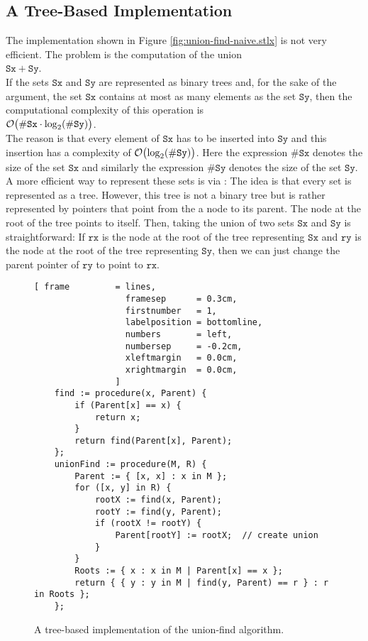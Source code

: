 \subsection{A Tree-Based Implementation}
The implementation shown in Figure \ref{fig:union-find-naive.stlx} is not very efficient.  The
problem is the computation of the union
\\
\hspace*{1.3cm}
$\mathtt{Sx} + \mathtt{Sy}$.
\\[0.2cm]
If the sets $\mathtt{Sx}$ and $\mathtt{Sy}$ are represented as binary trees and, for the sake of the
argument, the set $\mathtt{Sx}$ contains at most as many elements as the set $\mathtt{Sy}$, then the
computational complexity of this operation is
\\
\hspace*{1.3cm}
$\mathcal{O}\bigl(\mathtt{\#Sx} \cdot \log_2(\mathtt{\#Sy})\bigr)$.  
\\[0.2cm]
The reason is that every element of $\mathtt{Sx}$ has to be inserted into $\mathtt{Sy}$ and this
insertion has a complexity of $\mathcal{O}\bigl(\log_2(\#\mathtt{Sy})\bigr)$.  Here the expression
$\mathtt{\#Sx}$ denotes the size of the set $\mathtt{Sx}$ and similarly the expression
$\mathtt{\#Sy}$ denotes the size of the set $\mathtt{Sy}$.  A more efficient way to
represent these sets is via :  The idea is that every set is represented as a
tree.  However, this tree is not a binary tree but is rather represented by pointers that
point from the a node to its parent.  The node at the root of the tree points to itself.  Then, taking the
union of two sets $\mathtt{Sx}$ and $\mathtt{Sy}$ is straightforward:  If $\mathtt{rx}$ is the node at the root of
the tree representing $\mathtt{Sx}$ and $\mathtt{ry}$ is the node at the root of the tree representing
$\mathtt{Sy}$, then we can just change the parent pointer of $\mathtt{ry}$ to point to $\mathtt{rx}$.

\begin{figure}[!ht]
\centering
\begin{Verbatim}[ frame         = lines, 
                  framesep      = 0.3cm, 
                  firstnumber   = 1,
                  labelposition = bottomline,
                  numbers       = left,
                  numbersep     = -0.2cm,
                  xleftmargin   = 0.0cm,
                  xrightmargin  = 0.0cm,
                ]
    find := procedure(x, Parent) {
        if (Parent[x] == x) {
            return x;
        }
        return find(Parent[x], Parent);
    };
    unionFind := procedure(M, R) {
        Parent := { [x, x] : x in M };  
        for ([x, y] in R) {
            rootX := find(x, Parent);
            rootY := find(y, Parent);
            if (rootX != rootY) {
                Parent[rootY] := rootX;  // create union
            }
        }
        Roots := { x : x in M | Parent[x] == x };
        return { { y : y in M | find(y, Parent) == r } : r in Roots };
    };
\end{Verbatim}
\vspace*{-0.3cm}
\caption{A tree-based implementation of the union-find algorithm.}
\label{fig:union-find-tree.stlx}
\end{figure}

